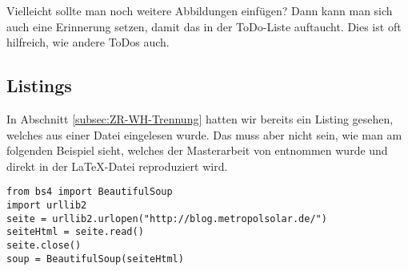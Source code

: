 %
Vielleicht sollte man noch weitere Abbildungen einfügen? Dann kann man sich auch eine Erinnerung setzen, damit das in der ToDo-Liste auftaucht.
%
%
Dies ist oft hilfreich, wie andere ToDos auch.
%
\subsection{Listings}
\label{subsec:Listings}
%
In Abschnitt \ref{subsec:ZR-WH-Trennung} hatten wir bereits ein Listing gesehen, welches aus einer
Datei eingelesen wurde. Das muss aber nicht sein, wie man am folgenden Beispiel sieht, welches der
Masterarbeit von \textcite{Walcher2014} entnommen wurde und direkt in der \LaTeX{}-Datei reproduziert
wird.

%
\lstset{basicstyle=\footnotesize, showstringspaces=false}
\begin{lstlisting}[label=lst:bs4,caption=Einlesen einer Webseite mit \Paket{BeautifulSoup}]
from bs4 import BeautifulSoup
import urllib2
seite = urllib2.urlopen("http://blog.metropolsolar.de/")
seiteHtml = seite.read()
seite.close()
soup = BeautifulSoup(seiteHtml)
\end{lstlisting}

